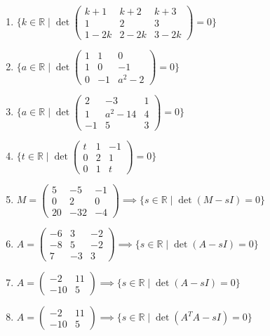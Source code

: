 \documentclass[11pt,a4paper]{article}
\begin{document}
\begin{enumerate}
\item $\displaystyle \{k \in \mathbb{R} \mid \det \begin{pmatrix} k + 1 & k + 2 & k + 3 \\ 1 & 2 & 3 \\ 1 - 2k & 2 - 2k & 3 - 2k \end{pmatrix} = 0\}$
\item $\displaystyle \{a \in \mathbb{R} \mid \det \begin{pmatrix} 1 & 1 & 0 \\ 1 & 0 & -1 \\ 0 & -1 & a^{2} - 2 \end{pmatrix} = 0\}$
\item $\displaystyle \{a \in \mathbb{R} \mid \det \begin{pmatrix} 2 & -3 & 1 \\ 1 & a^{2} - 14 & 4 \\ -1 & 5 & 3 \end{pmatrix} = 0\}$
\item $\displaystyle \{t \in \mathbb{R} \mid \det \begin{pmatrix} t & 1 & -1 \\ 0 & 2 & 1 \\ 0 & 1 & t \end{pmatrix} = 0\}$
\item $\displaystyle M = \begin{pmatrix} 5 & -5 & -1 \\ 0 & 2 & 0 \\ 20 & -32 & -4 \end{pmatrix} \implies \{s \in \mathbb{R} \mid \det\left( M - sI \right) = 0\}$
\item $\displaystyle A = \begin{pmatrix} -6 & 3 & -2 \\ -8 & 5 & -2 \\ 7 & -3 & 3 \end{pmatrix} \implies \{s \in \mathbb{R} \mid \det\left( A - sI \right) = 0\}$
\item $\displaystyle A = \begin{pmatrix} -2 & 11 \\ -10 & 5 \end{pmatrix} \implies \{s \in \mathbb{R} \mid \det\left( A - sI \right) = 0\}$
\item $\displaystyle A = \begin{pmatrix} -2 & 11 \\ -10 & 5 \end{pmatrix} \implies \{s \in \mathbb{R} \mid \det\left( A^{T} A - sI \right) = 0\}$

\end{enumerate}
\end{document}
